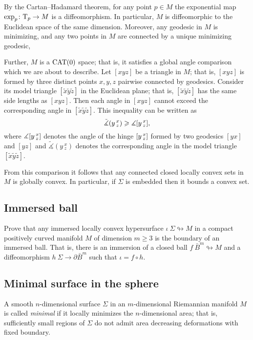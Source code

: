 By the Cartan--Hadamard theorem, for any point $p\in M$
the exponential map $\exp_p\colon\mathrm{T}_p\to M$ is a diffeomorphism.
In particular, $M$ is diffeomorphic to the Euclidean space of the same dimension.
Moreover, any geodesic in $M$ is minimizing,
and any two points in $M$ are connected by a unique minimizing geodesic,

Further, $M$ is a $\operatorname{\rm CAT}\nolimits(0)$ space; that is, it satisfies a global angle comparison which we are about to describe.
Let $[xyz]$ be a triangle in $M$;
that is, $[xyz]$ is formed by three distinct points $x,y,z$ pairwise connected by geodesics.
Consider its model triangle $[\tilde x\tilde y\tilde z]$ in the Euclidean plane;
that is, $[\tilde x\tilde y\tilde z]$ has the same side lengths as $[xyz]$.
Then each angle in $[xyz]$ cannot exceed the corresponding angle in $[\tilde x\tilde y\tilde z]$.
This inequality can be written as
\[\tilde\measuredangle(y\,^x_z)\geqslant\measuredangle[y\,{}^{x}_{z}],\]
where $\measuredangle[y\,{}^{x}_{z}]$ denotes the angle of the hinge $[y\,{}^{x}_{z}]$ formed by two geodesics $[yx]$ and $[yz]$ 
and $\tilde\measuredangle(y\,^x_z)$ denotes the corresponding angle in the model triangle $[\tilde x\tilde y\tilde z]$.

From this comparison it follows that any connected closed locally convex sets in $M$ is globally convex.
In particular, if $\Sigma$ is embedded then it bounds a convex set.


\subsection*{Immersed ball\hard}
\label{Immersed ball}

\begin{pr}
Prove that any immersed locally convex
hypersurface $\iota\:\Sigma\looparrowright M$
in a compact positively curved manifold $M$ of dimension $m\ge 3$ is the boundary of an immersed ball. 
That is, there is an immersion of a closed ball $f\:\bar B^m\looparrowright M$ and a diffeomorphism $h\:\Sigma\to\partial \bar B^m$
such that $\iota=f\circ h$.
\end{pr}

\subsection*{Minimal surface in the sphere}
\label{minimal surface}\label{almgren} 

A  smooth $n$-dimensional surface $\Sigma$ in
an $m$-dimensional Riemannian manifold $M$ is called \emph{minimal}
if it locally minimizes the $n$-dimensional area;
that is, sufficiently small regions of $\Sigma$ do not admit area decreasing deformations with fixed boundary.

